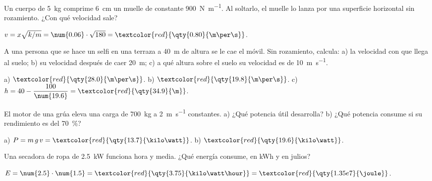 \begin{exercise}
    Un cuerpo de \qty{5}{\kg} comprime \qty{6}{\cm} un muelle de constante \qty{900}{\newton\per\m}. Al soltarlo, el muelle lo lanza por una
    superficie horizontal sin rozamiento. ¿Con qué velocidad sale?
    \begin{solu}
        \(v = x\sqrt{k/m} = \num{0.06} \cdot \sqrt{180} = \textcolor{red}{\qty{0.80}{\m\per\s}}\).
    \end{solu}
\end{exercise}

\begin{exercise}
    A una persona que se hace un selfi en una terraza a \qty{40}{\m} de altura se le cae el móvil. Sin rozamiento, calcula: a) la
    velocidad con que llega al suelo; b) su velocidad después de caer \qty{20}{\m}; c) a qué altura sobre el suelo su velocidad es de
    \qty{10}{\m\per\s}.
    \begin{solu}
        a) \(\textcolor{red}{\qty{28.0}{\m\per\s}}\). b) \(\textcolor{red}{\qty{19.8}{\m\per\s}}\). c) \(h = 40 - \dfrac{100}{\num{19.6}} =
        \textcolor{red}{\qty{34.9}{\m}}\).
    \end{solu}
\end{exercise}

\begin{exercise}
    El motor de una grúa eleva una carga de \qty{700}{\kg} a \qty{2}{\m\per\s} constantes. a) ¿Qué potencia útil desarrolla? b) ¿Qué
    potencia consume si su rendimiento es del \qty{70}{\percent}?
    \begin{solu}
        a) \(P = m\,g\,v = \textcolor{red}{\qty{13.7}{\kilo\watt}}\). b) \(\textcolor{red}{\qty{19.6}{\kilo\watt}}\).
    \end{solu}
\end{exercise}

\begin{exercise}
    Una secadora de ropa de \qty{2.5}{\kilo\watt} funciona hora y media. ¿Qué energía consume, en kWh y en julios?
    \begin{solu}
        \(E = \num{2.5} \cdot \num{1.5} = \textcolor{red}{\qty{3.75}{\kilo\watt\hour}} = \textcolor{red}{\qty{1.35e7}{\joule}}\).
    \end{solu}
\end{exercise}
